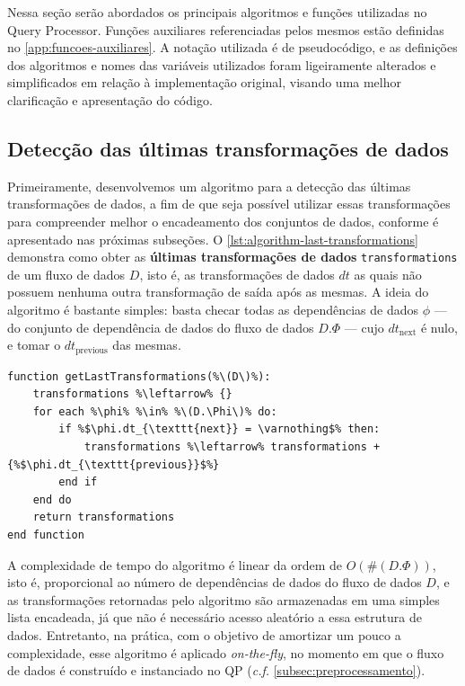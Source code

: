 Nessa seção serão abordados os principais algoritmos e funções utilizadas no Query Processor. Funções auxiliares referenciadas pelos mesmos estão definidas no \autoref{app:funcoes-auxiliares}. A notação utilizada é de pseudocódigo, e as definições dos algoritmos e nomes das variáveis utilizados foram ligeiramente alterados e simplificados em relação à implementação original, visando uma melhor clarificação e apresentação do código.

\subsection{Detecção das últimas transformações de dados}

Primeiramente, desenvolvemos um algoritmo para a detecção das últimas transformações de dados, a fim de que seja possível utilizar essas transformações para compreender melhor o encadeamento dos conjuntos de dados, conforme é apresentado nas próximas subseções. O \autoref{lst:algorithm-last-transformations} demonstra como obter as \textbf{últimas transformações de dados} \texttt{transformations} de um fluxo de dados \( D \), isto é, as transformações de dados \(dt\) as quais não possuem nenhuma outra transformação de saída após as mesmas. A ideia do algoritmo é bastante simples: basta checar todas as dependências de dados \( \phi \) --- do conjunto de dependência de dados do fluxo de dados \( D.\Phi \) --- cujo \( dt_{\textrm{next}} \) é nulo, e tomar o \( dt_{\textrm{previous}} \) das mesmas.

\begin{minipage}[c]{0.95\textwidth}
\begin{lstlisting}[language=pseudocode,label={lst:algorithm-last-transformations},caption={[Detecção das últimas transformações de dados]Detecção das útimas transformações de dados em uma especificação de fluxo de dados.}]
function getLastTransformations(%\(D\)%):
    transformations %\leftarrow% {}
    for each %\phi% %\in% %\(D.\Phi\)% do:
        if %$\phi.dt_{\texttt{next}} = \varnothing$% then:
            transformations %\leftarrow% transformations + {%$\phi.dt_{\texttt{previous}}$%}
        end if
    end do
    return transformations
end function
\end{lstlisting}
\end{minipage}

A complexidade de tempo do algoritmo é linear da ordem de \( O(\#(D.\Phi)) \), isto é, proporcional ao número de dependências de dados do fluxo de dados \( D \), e as transformações retornadas pelo algoritmo são armazenadas em uma simples lista encadeada, já que não é necessário acesso aleatório a essa estrutura de dados. Entretanto, na prática, com o objetivo de amortizar um pouco a complexidade, esse algoritmo é aplicado \textit{on-the-fly}, no momento em que o fluxo de dados é construído e instanciado no QP (\textit{c.f.} \autoref{subsec:preprocessamento}).


